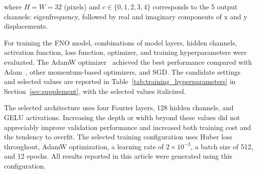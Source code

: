 \documentclass[preprint,review,12pt,numafflabel]{elsarticle}
\begin{document}
where $H = W = 32$ (pixels) and $c \in \{0,1,2,3,4\}$ corresponds to the 5 output channels: eigenfrequency, followed by real and imaginary components of x and y displacements.

For training the FNO model, combinations of model layers, hidden channels, activation function, loss function, optimizer, and training hyperparameters were evaluated. The AdamW optimizer~\cite{loshchilov2019adamw} achieved the best performance compared with Adam~\cite{kingma2015adam}, other momentum-based optimizers, and SGD. The candidate settings and selected values are reported in Table~\ref{tab:training_hyperparameters} in Section~\ref{sec:supplement}, with the selected values italicized.




The selected architecture uses four Fourier layers, 128 hidden channels, and GELU activations. Increasing the depth or width beyond these values did not appreciably improve validation performance and increased both training cost and the tendency to overfit. The selected training configuration uses Huber loss throughout, AdamW optimization, a learning rate of $2\times10^{-3}$, a batch size of 512, and 12 epochs. All results reported in this article were generated using this configuration.
\end{document}
